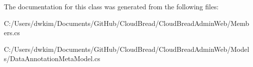 The documentation for this class was generated from the following files\+:\begin{DoxyCompactItemize}
\item 
C\+:/\+Users/dwkim/\+Documents/\+Git\+Hub/\+Cloud\+Bread/\+Cloud\+Bread\+Admin\+Web/Members.\+cs\item 
C\+:/\+Users/dwkim/\+Documents/\+Git\+Hub/\+Cloud\+Bread/\+Cloud\+Bread\+Admin\+Web/\+Models/Data\+Annotation\+Meta\+Model.\+cs\end{DoxyCompactItemize}
